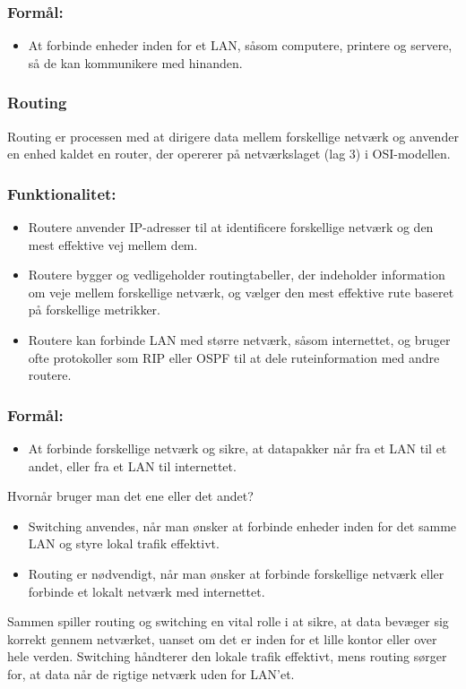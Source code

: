 \subsubsection{Formål:}
\begin{itemize}
	\item At forbinde enheder inden for et LAN, såsom computere, printere og servere, så de kan kommunikere med hinanden.
\end{itemize}
\subsubsection{Routing}
Routing er processen med at dirigere data mellem forskellige netværk og anvender en enhed kaldet en router, der opererer på netværkslaget (lag 3) i OSI-modellen.
\subsubsection{Funktionalitet:}
\begin{itemize}
	\item Routere anvender IP-adresser til at identificere forskellige netværk og den mest effektive vej mellem dem.
	\item Routere bygger og vedligeholder routingtabeller, der indeholder information om veje mellem forskellige netværk, og vælger den mest effektive rute baseret på forskellige metrikker.
	\item Routere kan forbinde LAN med større netværk, såsom internettet, og bruger ofte protokoller som RIP eller OSPF til at dele ruteinformation med andre routere.
\end{itemize}

\subsubsection{Formål:}
\begin{itemize}
	\item At forbinde forskellige netværk og sikre, at datapakker når fra et LAN til et andet, eller fra et LAN til internettet.
\end{itemize}	
Hvornår bruger man det ene eller det andet?
\begin{itemize}
	\item Switching anvendes, når man ønsker at forbinde enheder inden for det samme LAN og styre lokal trafik effektivt.
	\item Routing er nødvendigt, når man ønsker at forbinde forskellige netværk eller forbinde et lokalt netværk med internettet.
\end{itemize}
Sammen spiller routing og switching en vital rolle i at sikre, at data bevæger sig korrekt gennem netværket, uanset om det er inden for et lille kontor eller over hele verden. Switching håndterer den lokale trafik effektivt, mens routing sørger for, at data når de rigtige netværk uden for LAN'et.
